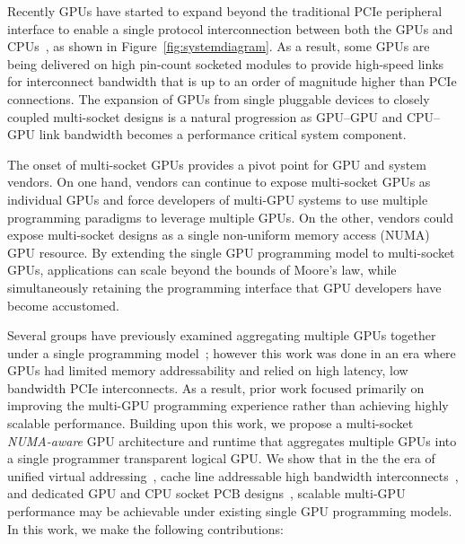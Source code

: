 Recently GPUs have started to expand beyond the traditional PCIe
peripheral interface to enable a single protocol interconnection
between both the GPUs and CPUs~\cite{dgx,SierraHPC,AMDINFINITYFABRIC},
as shown in Figure~\ref{fig:systemdiagram}.  As a result, some GPUs
are being delivered on high pin-count socketed modules to provide
high-speed links for interconnect bandwidth that is up to an order of
magnitude higher than PCIe connections.  The expansion of GPUs from
single pluggable devices to closely coupled multi-socket designs is a
natural progression as GPU--GPU and CPU--GPU link bandwidth becomes a
performance critical system component.

The onset of multi-socket GPUs provides a pivot point for GPU and system 
vendors. On one hand, vendors can continue to expose multi-socket GPUs as 
individual GPUs and force developers of multi-GPU systems to use multiple
programming paradigms to 
leverage multiple GPUs. On the other, vendors could expose multi-socket 
designs as a single non-uniform memory access (NUMA) GPU resource.  By 
extending the single GPU programming model to multi-socket GPUs,  applications 
can scale beyond the bounds of Moore's law, while simultaneously retaining the 
programming interface that GPU developers have become accustomed.

Several groups have previously examined aggregating multiple GPUs together under 
a single programming model~\cite{lee2013transparent,Cabezas2015}; however this 
work was done in an era where GPUs had limited memory addressability and relied 
on high latency, low bandwidth PCIe interconnects. As a result, prior work 
focused primarily on improving the multi-GPU programming experience rather than 
achieving highly scalable performance. Building upon this work, we propose a 
multi-socket \textit{NUMA-aware} GPU architecture and runtime that aggregates 
multiple GPUs into a single programmer transparent logical GPU. We show that in 
the the era of unified virtual addressing~\cite{UVM}, cache line addressable 
high bandwidth interconnects~\cite{NVLINK}, and dedicated GPU and CPU socket PCB 
designs~\cite{SierraHPC}, scalable multi-GPU performance may be achievable under 
existing single GPU programming models. In this work, we make the following 
contributions:

